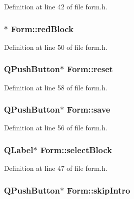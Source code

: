 Definition at line 42 of file form.h.\hypertarget{class_form_af3d2b490d97327ae579f814e3f620dcb}{
\subsubsection[{redBlock}]{$\ast$ {\bf Form::redBlock}}}
\label{class_form_af3d2b490d97327ae579f814e3f620dcb}


Definition at line 50 of file form.h.\hypertarget{class_form_a651bf23926cdc9be577fa056ef15638f}{
\subsubsection[{reset}]{\setlength{\rightskip}{0pt plus 5cm}QPushButton$\ast$ {\bf Form::reset}}}
\label{class_form_a651bf23926cdc9be577fa056ef15638f}


Definition at line 58 of file form.h.\hypertarget{class_form_a1bdf42fb82d80d614324a9a0cd7b960e}{
\subsubsection[{save}]{\setlength{\rightskip}{0pt plus 5cm}QPushButton$\ast$ {\bf Form::save}}}
\label{class_form_a1bdf42fb82d80d614324a9a0cd7b960e}


Definition at line 56 of file form.h.\hypertarget{class_form_a473ac73bbd99b470d340f9c613bfb5a7}{
\subsubsection[{selectBlock}]{\setlength{\rightskip}{0pt plus 5cm}QLabel$\ast$ {\bf Form::selectBlock}}}
\label{class_form_a473ac73bbd99b470d340f9c613bfb5a7}


Definition at line 47 of file form.h.\hypertarget{class_form_af12436143c1da6a3a491fa941aa8924b}{
\subsubsection[{skipIntro}]{\setlength{\rightskip}{0pt plus 5cm}QPushButton$\ast$ {\bf Form::skipIntro}}}
\label{class_form_af12436143c1da6a3a491fa941aa8924b}


